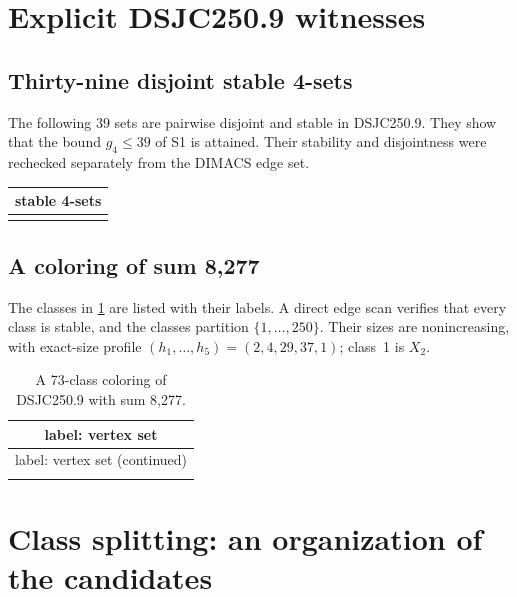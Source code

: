 \documentclass[11pt]{article}
\theoremstyle{definition}
\newcommand{\DSJCTwoFifty}{\textnormal{\textsc{DSJC250.9}}}
\begin{document}
\section{Explicit \DSJCTwoFifty{} witnesses}
\label{app:witnesses}

\subsection{Thirty-nine disjoint stable 4-sets}

The following $39$ sets are pairwise disjoint and stable in \DSJCTwoFifty{}.
They show that the bound $g_4\le39$ of S1 is attained. Their stability and
disjointness were rechecked separately from the DIMACS edge set.

\begin{center}
\small
\begin{tabular}{@{}lll@{}}
\toprule
\multicolumn{3}{c}{stable 4-sets}\\
\midrule
\tabularnewline
\bottomrule
\end{tabular}
\end{center}

\subsection{A coloring of sum 8,277}

The classes in \cref{tab:dsjc250-coloring} are listed with their labels. A
direct edge scan verifies that every class is stable, and the classes
partition $\{1,\ldots,250\}$. Their sizes are nonincreasing, with exact-size
profile $(h_1,\ldots,h_5)=(2,4,29,37,1)$; class~1 is $X_2$.

\begin{center}
\scriptsize
\setlength{\tabcolsep}{3pt}
\begin{longtable}{@{}lll@{}}
\caption{A 73-class coloring of \DSJCTwoFifty{} with sum 8,277.}
\label{tab:dsjc250-coloring}\\
\toprule
\multicolumn{3}{c}{label: vertex set}\\
\midrule
\endfirsthead
\toprule
\multicolumn{3}{c}{label: vertex set (continued)}\\
\midrule
\endhead
\tabularnewline
\bottomrule
\end{longtable}
\end{center}

\section{Class splitting: an organization of the candidates}
\label{app:splitting}
\end{document}
